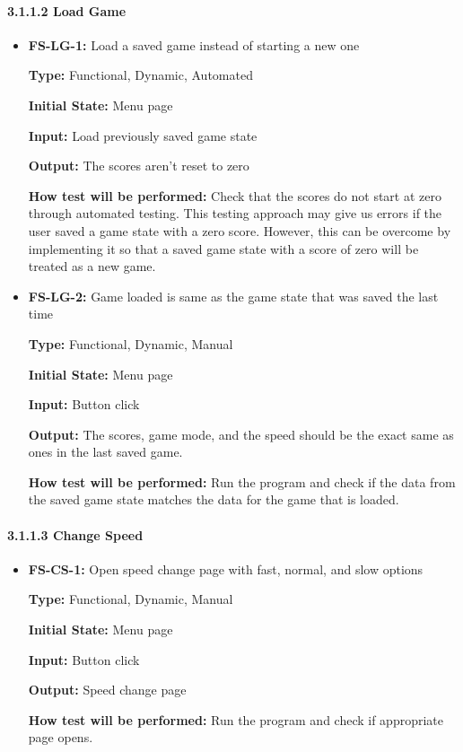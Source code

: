 \documentclass[12pt,letterpaper]{article}
\begin{document}
	\paragraph{3.1.1.2 Load Game}
\begin{reqbox}
	\begin{itemize}
	\item \textbf{FS-LG-1:} Load a saved game instead of starting a new one

	\textbf{Type:} Functional, Dynamic, Automated

	\textbf{Initial State: }Menu page

	\textbf{Input: }Load previously saved game state

	\textbf{Output: }The scores aren’t reset to zero

	\textbf{How test will be performed: }Check that the scores do not start at zero through automated testing. This testing approach may give us errors if the user saved a game state with a zero score. However, this can be overcome by implementing it so that a saved game state with a score of zero will be treated as a new game.
	\end{itemize}
\end{reqbox}

\begin{reqbox}
	\begin{itemize}
	\item \textbf{FS-LG-2: }Game loaded is same as the game state that was saved the last time

	\textbf{Type: }Functional, Dynamic, Manual

	\textbf{Initial State:} Menu page

	\textbf{Input:} Button click

	\textbf{Output: }The scores, game mode, and the speed should be the exact same as ones in the last saved game.

	\textbf{How test will be performed: }Run the program and check if the data from the saved game state matches the data for the game that is loaded.
	\end{itemize}
\end{reqbox}

	\paragraph{3.1.1.3 Change Speed}
\begin{reqbox}
	\begin{itemize}
	\item \textbf{FS-CS-1: }Open speed change page with fast, normal, and slow options

	\textbf{Type: }Functional, Dynamic, Manual

	\textbf{Initial State:} Menu page

	\textbf{Input: }Button click

	\textbf{Output: }Speed change page

	\textbf{How test will be performed: }Run the program and check if appropriate page opens.
	\end{itemize}
\end{reqbox}
\end{document}
